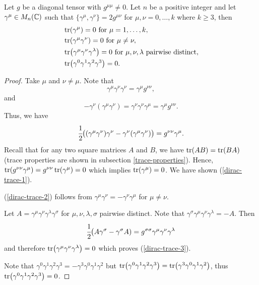 \documentclass[main.tex]{subfiles}
\begin{document}
\begin{lemma}
Let $g$ be a diagonal tensor with $g^{\mu\mu}\not=0$. 
Let $n$ be a positive integer and let $\gamma^\mu\in M_n(\mathbb{C})$ 
such that $\{\gamma^\mu, \gamma^\nu\} = 2g^{\mu\nu}$ for $\mu, \nu = 0, \dots, k$ where $k \geq 3$, then
\begin{align}
\label{dirac-trace-1}
& \tr(\gamma^\mu)=0 \text{ for } \mu=1, \dots, k, \\
\label{dirac-trace-2}
& \tr(\gamma^\mu\gamma^\nu) = 0 \text{ for } \mu\not=\nu,\\
\label{dirac-trace-3}
& \tr(\gamma^\mu\gamma^\nu\gamma^\lambda) = 0 \text{ for } \mu, \nu, \lambda \text{ pairwise distinct},\\
\label{dirac-trace-4}
& \tr(\gamma^0\gamma^1\gamma^2\gamma^3) = 0.
\end{align}
\end{lemma}
\begin{proof}
Take $\mu$ and $\nu\not = \mu$. Note that
\begin{equation}
\gamma^\mu \gamma^\nu \gamma^\nu = \gamma^\mu g^{\nu\nu},
\end{equation}
and
\begin{equation}
-\gamma^\nu (\gamma^\mu \gamma^\nu) =\gamma^\nu \gamma^\nu \gamma^\mu = \gamma^\mu g^{\nu\nu}.
\end{equation}
Thus, we have
\begin{equation}
\cfrac{1}{2}\big((\gamma^\mu \gamma^\nu) \gamma^\nu - \gamma^\nu (\gamma^\mu \gamma^\nu)\big) = g^{\nu\nu}\gamma^\mu.
\end{equation}
Recall that for any two square matrices $A$ and $B$, we have $\tr(AB) = \tr(BA)$ (trace properties are shown in subsection \ref{trace-properties}). Hence, $\tr(g^{\nu\nu}\gamma^\mu) = g^{\nu\nu} \tr(\gamma^\mu) = 0$ which implies $\tr(\gamma^\mu)=0$. We have shown (\ref{dirac-trace-1}). 

(\ref{dirac-trace-2}) follows from  $\gamma^\mu\gamma^\nu = - \gamma^\nu\gamma^\mu$ for $\mu\not=\nu$.

Let $A = \gamma^\mu\gamma^\nu\gamma^\lambda\gamma^\sigma$ for $\mu, \nu, \lambda, \sigma$ pairwise distinct. Note that $\gamma^\sigma\gamma^\mu\gamma^\nu\gamma^\lambda = -A$. Then
\begin{equation}
\cfrac{1}{2}\big(A\gamma^\sigma - \gamma^\sigma A) = g^{\sigma\sigma} \gamma^\mu\gamma^\nu\gamma^\lambda
\end{equation}
and therefore $\tr(\gamma^\mu\gamma^\nu\gamma^\lambda)=0$ which proves (\ref{dirac-trace-3}).

Note that $\gamma^0\gamma^1\gamma^2\gamma^3 = -\gamma^3\gamma^0\gamma^1\gamma^2$ but 
$\tr(\gamma^0\gamma^1\gamma^2\gamma^3) = \tr(\gamma^3\gamma^0\gamma^1\gamma^2)$, thus
$\tr(\gamma^0\gamma^1\gamma^2\gamma^3) = 0$.
\end{proof}
 
\end{document}
